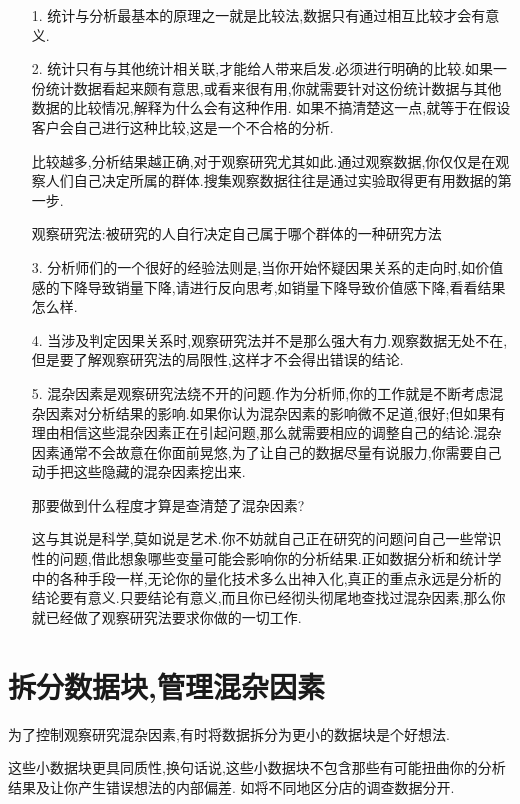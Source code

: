 \documentclass[11pt,a4paper,oneside]{book}
\begin{document}
\begin{enumerate}
	\item[1.]统计与分析最基本的原理之一就是比较法,数据只有通过相互比较才会有意义.
	
	\item[2.]统计只有与其他统计相关联,才能给人带来启发.必须进行明确的比较.如果一份统计数据看起来颇有意思,或看来很有用,你就需要针对这份统计数据与其他数据的比较情况,解释为什么会有这种作用. 如果不搞清楚这一点,就等于在假设客户会自己进行这种比较,这是一个不合格的分析.
	
	比较越多,分析结果越正确,对于观察研究尤其如此.通过观察数据,你仅仅是在观察人们自己决定所属的群体.搜集观察数据往往是通过实验取得更有用数据的第一步.
	
	\begin{tcolorbox}[colback=pink!10!white,colframe=pink!100!black]
    观察研究法:被研究的人自行决定自己属于哪个群体的一种研究方法
	\end{tcolorbox}

	\item[3.]分析师们的一个很好的经验法则是,当你开始怀疑因果关系的走向时,如价值感的下降导致销量下降,请进行反向思考,如销量下降导致价值感下降,看看结果怎么样.
	\item[4.]当涉及判定因果关系时,观察研究法并不是那么强大有力.观察数据无处不在,但是要了解观察研究法的局限性,这样才不会得出错误的结论.
	\item[5.]混杂因素是观察研究法绕不开的问题.作为分析师,你的工作就是不断考虑混杂因素对分析结果的影响.如果你认为混杂因素的影响微不足道,很好;但如果有理由相信这些混杂因素正在引起问题,那么就需要相应的调整自己的结论.混杂因素通常不会故意在你面前晃悠,为了让自己的数据尽量有说服力,你需要自己动手把这些隐藏的混杂因素挖出来.
	
	那要做到什么程度才算是查清楚了混杂因素?
	
	这与其说是科学,莫如说是艺术.你不妨就自己正在研究的问题问自己一些常识性的问题,借此想象哪些变量可能会影响你的分析结果.正如数据分析和统计学中的各种手段一样,无论你的量化技术多么出神入化,真正的重点永远是分析的结论要有意义.只要结论有意义,而且你已经彻头彻尾地查找过混杂因素,那么你就已经做了观察研究法要求你做的一切工作.
\end{enumerate} 
\section{拆分数据块,管理混杂因素}
为了控制观察研究混杂因素,有时将数据拆分为更小的数据块是个好想法.

这些小数据块更具同质性,换句话说,这些小数据块不包含那些有可能扭曲你的分析结果及让你产生错误想法的内部偏差.
如将不同地区分店的调查数据分开.
\end{document}
